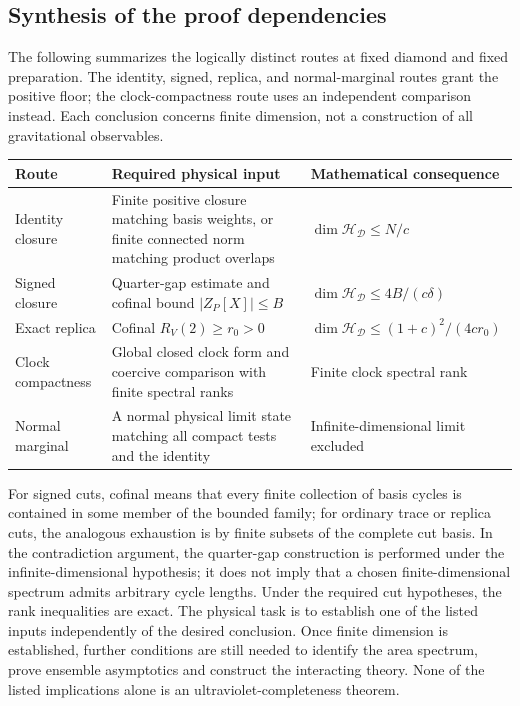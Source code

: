 \documentclass[11pt]{article}
\newcommand{\HH}{\mathcal H_{\mathcal D}}
\begin{document}
\subsection{Synthesis of the proof dependencies}
The following summarizes the logically distinct routes at fixed diamond and fixed preparation. The identity, signed, replica, and normal-marginal routes grant the positive floor; the clock-compactness route uses an independent comparison instead. Each conclusion concerns finite dimension, not a construction of all gravitational observables.
\begin{center}
\small
\begin{tabular}{>{\raggedright\arraybackslash}p{.23\linewidth}>{\raggedright\arraybackslash}p{.41\linewidth}>{\raggedright\arraybackslash}p{.26\linewidth}}
\toprule
Route & Required physical input & Mathematical consequence\\
\midrule
Identity closure & Finite positive closure matching basis weights, or finite connected norm matching product overlaps & $\dim\HH\le N/c$\\[3pt]
Signed closure & Quarter-gap estimate and cofinal bound $|Z_P[X]|\le B$ & $\dim\HH\le4B/(c\delta)$\\[3pt]
Exact replica & Cofinal $R_V(2)\ge r_0>0$ & $\dim\HH\le(1+c)^2/(4cr_0)$\\[3pt]
Clock compactness & Global closed clock form and coercive comparison with finite spectral ranks & Finite clock spectral rank\\[3pt]
Normal marginal & A normal physical limit state matching all compact tests and the identity & Infinite-dimensional limit excluded\\
\bottomrule
\end{tabular}
\end{center}
For signed cuts, cofinal means that every finite collection of basis cycles is contained in some member of the bounded family; for ordinary trace or replica cuts, the analogous exhaustion is by finite subsets of the complete cut basis. In the contradiction argument, the quarter-gap construction is performed under the infinite-dimensional hypothesis; it does not imply that a chosen finite-dimensional spectrum admits arbitrary cycle lengths. Under the required cut hypotheses, the rank inequalities are exact. The physical task is to establish one of the listed inputs independently of the desired conclusion. Once finite dimension is established, further conditions are still needed to identify the area spectrum, prove ensemble asymptotics and construct the interacting theory. None of the listed implications alone is an ultraviolet-completeness theorem.
\end{document}
